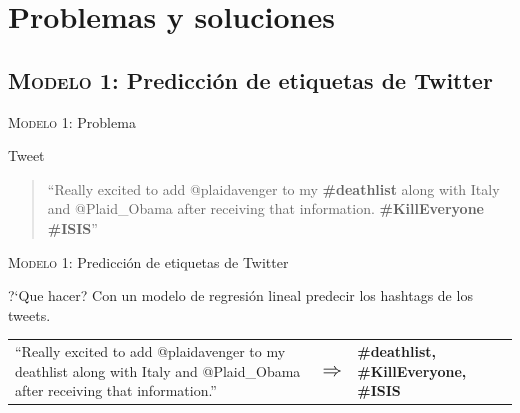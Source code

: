 \documentclass[10pt]{beamer}
\begin{document}



\section{Problemas y soluciones}

\subsection{\textsc{Modelo 1:} Predicción de etiquetas de Twitter}

\begin{frame}{\textsc{Modelo 1:} Problema}
  \begin{alertblock}{Tweet}
    \begin{quote}
    ``Really excited to add @plaidavenger to my \textbf{\#deathlist} along with Italy and @Plaid\_Obama after receiving that information. \textbf{\#KillEveryone} \textbf{\#ISIS}''
    \end{quote}
  \end{alertblock}
\end{frame}

\begin{frame}{\textsc{Modelo 1:} Predicción de etiquetas de Twitter}
  \begin{alertblock}{?`Que hacer?}
    Con un modelo de regresión lineal predecir los hashtags de los tweets.
  \end{alertblock}
  \vspace{2em}
  
  \begin{tabular}{p{} p{} p{}}
    ``Really excited to add @plaidavenger to my deathlist along with Italy and @Plaid\_Obama after receiving that information.'' & $\mathlarger{\mathlarger{\mathlarger{\Rightarrow}}}$ & \textbf{\#deathlist, \#KillEveryone, \#ISIS}
    \end{tabular}
\end{frame}
\end{document}
